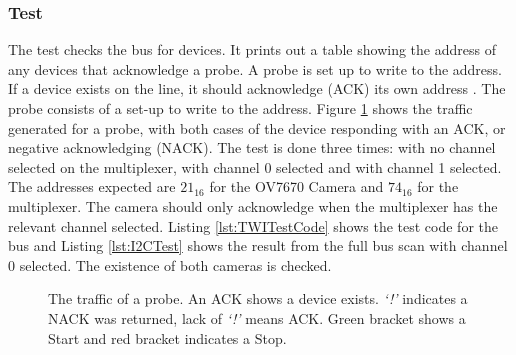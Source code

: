 \subsubsection{\itc Test}\label{I2C:Test}
The \itc test checks the bus for devices. It prints out a table showing the address of any devices that acknowledge a probe. A probe is set up to write to the address. If a device exists on the line, it should acknowledge (ACK) its own address \citep{Philips:I2C}. The probe consists of a set-up to write to the address. Figure \ref{fig:I2C} shows the \itc traffic generated for a probe, with both cases of the device responding with an ACK, or negative acknowledging (NACK). The test is done three times: with no channel selected on the \itc multiplexer, with channel 0 selected and with channel 1 selected. The addresses expected are $21_{16}$ for the OV7670 Camera and $74_{16}$ for the \itc multiplexer. The camera should only acknowledge when the \itc multiplexer has the relevant channel selected. Listing \ref{lst:TWITestCode} shows the test code for the \itc bus and Listing \ref{lst:I2CTest} shows the result from the full bus scan with channel 0 selected. The existence of both cameras is checked. %
\begin{figure}
\caption{The \itc traffic of a probe. An ACK shows a device exists. \textit{`!'} indicates a NACK was returned, lack of \textit{`!'} means ACK. Green bracket shows a Start and red bracket indicates a Stop.}
\label{fig:I2C}
\end{figure}


